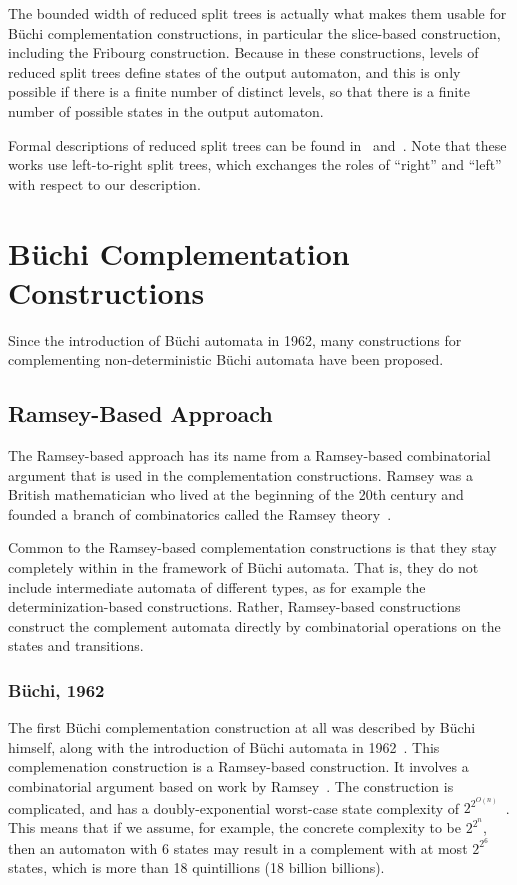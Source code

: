 The bounded width of reduced split trees is actually what makes them usable for Büchi complementation constructions, in particular the slice-based construction, including the Fribourg construction. Because in these constructions, levels of reduced split trees define states of the output automaton, and this is only possible if there is a finite number of distinct levels, so that there is a finite number of possible states in the output automaton.

Formal descriptions of reduced split trees can be found in~\cite{vardi2007automata} and~\cite{2014_wilke}. Note that these works use left-to-right split trees, which exchanges the roles of ``right'' and ``left'' with respect to our description.



\section{Büchi Complementation Constructions}
\label{2_constructions}
Since the introduction of Büchi automata in 1962, many constructions for complementing non-deterministic Büchi automata have been proposed. 



\subsection{Ramsey-Based Approach}
The Ramsey-based approach has its name from a Ramsey-based combinatorial argument that is used in the complementation constructions. Ramsey was a British mathematician who lived at the beginning of the 20th century and founded a branch of combinatorics called the Ramsey theory~\cite{graham1990ramsey}.

Common to the  Ramsey-based complementation constructions is that they stay completely within in the framework of Büchi automata. That is, they do not include intermediate automata of different types, as for example the determinization-based constructions. Rather, Ramsey-based constructions construct the complement automata directly by combinatorial operations on the states and transitions.

\subsubsection{Büchi, 1962}

The first Büchi complementation construction at all was described by Büchi himself, along with the introduction of Büchi automata in 1962~\cite{buchi1960decision}. This complemenation construction is a Ramsey-based construction. It involves a combinatorial argument based on work by Ramsey~\cite{1930ramsey}. The construction is complicated, and has a doubly-exponential worst-case state complexity of $2^{2^{O\left(n\right)}}$~\cite{vardi2005buchi}. This means that if we assume, for example, the concrete complexity to be $2^{2^n}$, then an automaton with 6 states may result in a complement with at most $2^{2^6}$ states, which is more than 18 quintillions (18 billion billions).

